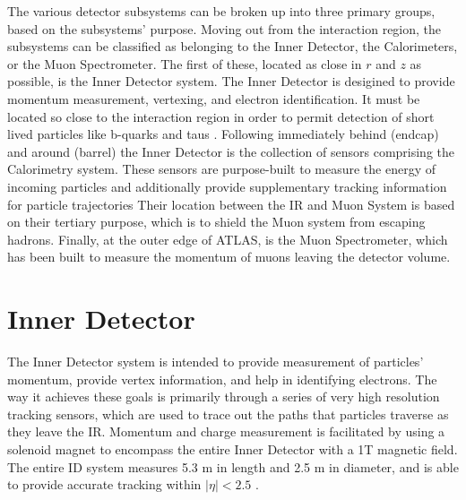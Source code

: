     The various detector subsystems can be broken up into three primary groups, based on the subsystems' purpose.
    Moving out from the interaction region, the subsystems can be classified as belonging to the Inner Detector, the Calorimeters, or the Muon Spectrometer.
    The first of these, located as close in $r$ and $z$ as possible, is the Inner Detector system.
    The Inner Detector is desigined to provide momentum measurement, vertexing, and electron identification.
    It must be located so close to the interaction region in order to permit detection of short lived particles like b-quarks and taus \cite{CERN-LHCC-97-016}.
    Following immediately behind (endcap) and around (barrel) the Inner Detector is the collection of sensors comprising the Calorimetry system.
    These sensors are purpose-built to measure the energy of incoming particles and additionally provide supplementary tracking information for particle trajectories
    Their location between the IR and Muon System is based on their tertiary purpose, which is to shield the Muon system from escaping hadrons.
    Finally, at the outer edge of ATLAS, is the Muon Spectrometer, which has been built to measure the momentum of muons leaving the detector volume.
    




\section{Inner Detector} %
    
    The Inner Detector system is intended to provide measurement of particles' momentum, provide vertex information, and help in identifying electrons.
    The way it achieves these goals is primarily through a series of very high resolution tracking sensors, which are used to trace out the paths that particles traverse as they leave the IR. 
    Momentum and charge measurement is facilitated by using a solenoid magnet to encompass the entire Inner Detector with a 1T magnetic field.
    The entire ID system measures 5.3 m in length and 2.5 m in diameter, and is able to provide accurate tracking within $|\eta| < 2.5$ \cite{id_tdr}.


